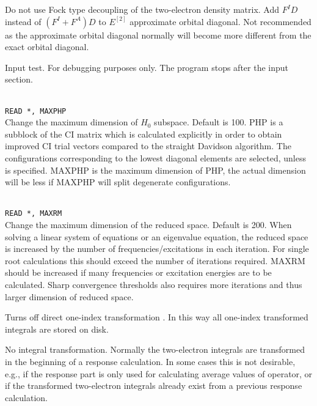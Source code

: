 \begin{description}
\item{}
Do not use Fock type decoupling of the two-electron density matrix.
Add $F^ID$ instead of $(F^I+F^A)D$ to $E^{[2]}$ approximate
orbital diagonal. Not recommended as the approximate orbital diagonal
normally will become more different from the exact orbital diagonal.

\item{}
Input test. For debugging purposes only. The program stops after the
input section.

\item{}\\
\verb|READ *, MAXPHP|\\
Change the maximum dimension of $H_0$ subspace.   Default is 100.
PHP is a subblock of the CI matrix which is calculated explicitly
in order to obtain improved CI trial vectors compared to the
straight Davidson algorithm\cite{erdjcp17}.  The configurations
corresponding to 
the lowest diagonal elements are selected, unless  is
specified. MAXPHP is the maximum dimension of PHP, the 
actual dimension will be less if MAXPHP will split degenerate configurations.
 
\item{}\\
\verb|READ *, MAXRM |\\
Change the maximum dimension of the reduced space. Default is 200.
When solving a linear system of equations or an eigenvalue equation,
the reduced space is increased by the number of
frequencies/excitations in each iteration. For single root
calculations this should exceed the number of iterations required.
MAXRM should be increased if many frequencies or excitation energies
are to be calculated.
Sharp convergence thresholds also requires
more iterations and thus larger dimension of reduced space.

\item{}
Turns off direct one-index transformation \cite{ovhahjajjcc15}. 
In this way all one-index transformed integrals are stored on disk.

\item{}
No integral transformation. Normally the two-electron integrals are 
transformed in the beginning of a response calculation. In some cases
this is not desirable, e.g., if the response part is only used for
calculating average values of operator, or if the transformed two-electron
integrals already exist from a previous response calculation. 


\end{description}
